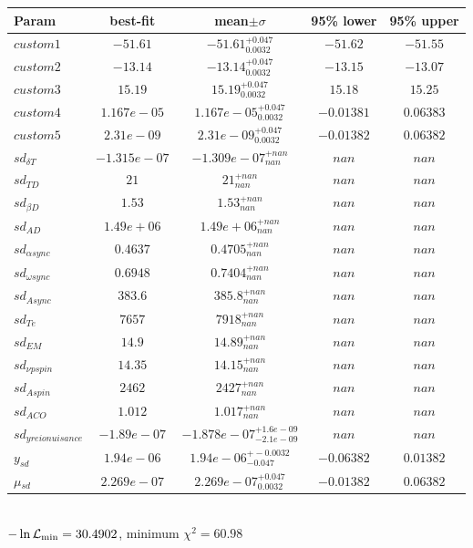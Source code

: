 \begin{tabular}{|l|c|c|c|c|} 
 \hline 
Param & best-fit & mean$\pm\sigma$ & 95\% lower & 95\% upper \\ \hline 
$custom1$ &$-51.61$ & $-51.61_{0.0032}^{+0.047}$ & $-51.62$ & $-51.55$ \\ 
$custom2$ &$-13.14$ & $-13.14_{0.0032}^{+0.047}$ & $-13.15$ & $-13.07$ \\ 
$custom3$ &$15.19$ & $15.19_{0.0032}^{+0.047}$ & $15.18$ & $15.25$ \\ 
$custom4$ &$1.167e-05$ & $1.167e-05_{0.0032}^{+0.047}$ & $-0.01381$ & $0.06383$ \\ 
$custom5$ &$2.31e-09$ & $2.31e-09_{0.0032}^{+0.047}$ & $-0.01382$ & $0.06382$ \\ 
$sd_{\delta{} T }$ &$-1.315e-07$ & $-1.309e-07_{nan}^{+nan}$ & $nan$ & $nan$ \\ 
$sd_{T D }$ &$21$ & $21_{nan}^{+nan}$ & $nan$ & $nan$ \\ 
$sd_{\beta{} D }$ &$1.53$ & $1.53_{nan}^{+nan}$ & $nan$ & $nan$ \\ 
$sd_{A D }$ &$1.49e+06$ & $1.49e+06_{nan}^{+nan}$ & $nan$ & $nan$ \\ 
$sd_{\alpha{} sync }$ &$0.4637$ & $0.4705_{nan}^{+nan}$ & $nan$ & $nan$ \\ 
$sd_{\omega{} sync }$ &$0.6948$ & $0.7404_{nan}^{+nan}$ & $nan$ & $nan$ \\ 
$sd_{A sync }$ &$383.6$ & $385.8_{nan}^{+nan}$ & $nan$ & $nan$ \\ 
$sd_{T e }$ &$7657$ & $7918_{nan}^{+nan}$ & $nan$ & $nan$ \\ 
$sd_{EM }$ &$14.9$ & $14.89_{nan}^{+nan}$ & $nan$ & $nan$ \\ 
$sd_{\nu{} p spin }$ &$14.35$ & $14.15_{nan}^{+nan}$ & $nan$ & $nan$ \\ 
$sd_{A spin }$ &$2462$ & $2427_{nan}^{+nan}$ & $nan$ & $nan$ \\ 
$sd_{A CO }$ &$1.012$ & $1.017_{nan}^{+nan}$ & $nan$ & $nan$ \\ 
$sd_{y reio nuisance }$ &$-1.89e-07$ & $-1.878e-07_{-2.1e-09}^{+1.6e-09}$ & $nan$ & $nan$ \\ 
$y_{sd }$ &$1.94e-06$ & $1.94e-06_{-0.047}^{+-0.0032}$ & $-0.06382$ & $0.01382$ \\ 
$\mu{}_{sd }$ &$2.269e-07$ & $2.269e-07_{0.0032}^{+0.047}$ & $-0.01382$ & $0.06382$ \\ 
\hline 
 \end{tabular} \\ 
$-\ln{\cal L}_\mathrm{min} =30.4902$, minimum $\chi^2=60.98$ \\ 
